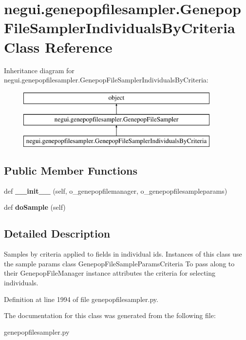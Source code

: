\hypertarget{classnegui_1_1genepopfilesampler_1_1GenepopFileSamplerIndividualsByCriteria}{}\section{negui.\+genepopfilesampler.\+Genepop\+File\+Sampler\+Individuals\+By\+Criteria Class Reference}
\label{classnegui_1_1genepopfilesampler_1_1GenepopFileSamplerIndividualsByCriteria}
Inheritance diagram for negui.\+genepopfilesampler.\+Genepop\+File\+Sampler\+Individuals\+By\+Criteria\+:\begin{figure}[H]
\begin{center}
\leavevmode
\includegraphics[height=3.000000cm]{classnegui_1_1genepopfilesampler_1_1GenepopFileSamplerIndividualsByCriteria}
\end{center}
\end{figure}
\subsection*{Public Member Functions}
\begin{DoxyCompactItemize}
\item 
def {\bfseries \+\_\+\+\_\+init\+\_\+\+\_\+} (self, o\+\_\+genepopfilemanager, o\+\_\+genepopfilesampleparams)\hypertarget{classnegui_1_1genepopfilesampler_1_1GenepopFileSamplerIndividualsByCriteria_a8e1ef3907b3d37dccf9174e66c210d0b}{}\label{classnegui_1_1genepopfilesampler_1_1GenepopFileSamplerIndividualsByCriteria_a8e1ef3907b3d37dccf9174e66c210d0b}

\item 
def {\bfseries do\+Sample} (self)\hypertarget{classnegui_1_1genepopfilesampler_1_1GenepopFileSamplerIndividualsByCriteria_aa40b9d843febb0279324744b898d9b3d}{}\label{classnegui_1_1genepopfilesampler_1_1GenepopFileSamplerIndividualsByCriteria_aa40b9d843febb0279324744b898d9b3d}

\end{DoxyCompactItemize}


\subsection{Detailed Description}
\begin{DoxyVerb}Samples by criteria applied to fields in individual ids.  
Instances of this class use the sample params class GenepopFileSampleParamsCriteria
To pass along to their GenepopFileManager instance attributes the criteria
for selecting individuals.
\end{DoxyVerb}
 

Definition at line 1994 of file genepopfilesampler.\+py.



The documentation for this class was generated from the following file\+:\begin{DoxyCompactItemize}
\item 
genepopfilesampler.\+py\end{DoxyCompactItemize}
